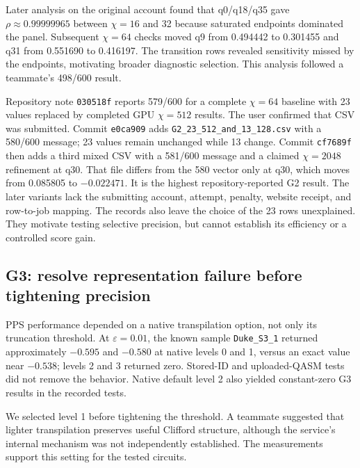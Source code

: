 \documentclass[11pt]{article}
\newcommand{\file}[1]{\nolinkurl{#1}}
\newcommand{\eps}{\varepsilon}
\begin{document}
Later analysis on the original account found that q0/q18/q35 gave $\rho\approx0.99999965$ between $\chi=16$ and 32 because saturated endpoints dominated the panel. Subsequent $\chi=64$ checks moved q9 from 0.494442 to 0.301455 and q31 from 0.551690 to 0.416197. The transition rows revealed sensitivity missed by the endpoints, motivating broader diagnostic selection. This analysis followed a teammate's 498/600 result.\cite{decisions,ledger}

Repository note \file{030518f} reports 579/600 for a complete $\chi=64$ baseline with 23 values replaced by completed GPU $\chi=512$ results. The user confirmed that CSV was submitted. Commit \file{e0ca909} adds \file{G2_23_512_and_13_128.csv} with a 580/600 message; 23 values remain unchanged while 13 change. Commit \file{cf7689f} then adds a third mixed CSV with a 581/600 message and a claimed $\chi=2048$ refinement at q30. That file differs from the 580 vector only at q30, which moves from 0.085805 to $-0.022471$. It is the highest repository-reported G2 result. The later variants lack the submitting account, attempt, penalty, website receipt, and row-to-job mapping. The records also leave the choice of the 23 rows unexplained. They motivate testing selective precision, but cannot establish its efficiency or a controlled score gain.\cite{ledger}

\subsection{G3: resolve representation failure before tightening precision}
PPS performance depended on a native transpilation option, not only its truncation threshold. At $\eps=0.01$, the known sample \file{Duke_S3_1} returned approximately $-0.595$ and $-0.580$ at native levels 0 and 1, versus an exact value near $-0.538$; levels 2 and 3 returned zero. Stored-ID and uploaded-QASM tests did not remove the behavior. Native default level 2 also yielded constant-zero G3 results in the recorded tests.\cite{teammate-1}

We selected level 1 before tightening the threshold. A teammate suggested that lighter transpilation preserves useful Clifford structure, although the service's internal mechanism was not independently established. The measurements support this setting for the tested circuits.

\newpage
\end{document}
